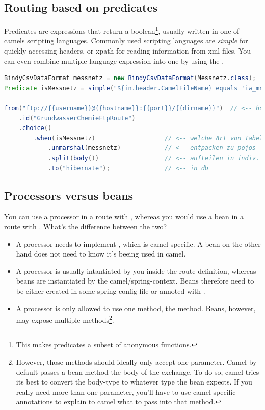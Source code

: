 \subsection{Routing based on predicates}
Predicates are expressions that return a boolean\footnote{This makes predicates a subset of anonymous functions.}, usually written in one of camels scripting languages. 
Commonly used scripting languages are \emph{simple} for quickly accessing headers, or xpath for reading information from xml-files. You can even combine multiple language-expression into one by using the .

\begin{lstlisting}[language=java]
BindyCsvDataFormat messnetz = new BindyCsvDataFormat(Messnetz.class);
Predicate isMessnetz = simple("${in.header.CamelFileName} equals 'iw_mn.txt'");

from("ftp://{{username}}@{{hostname}}:{{port}}/{{dirname}}")  // <-- hole von ftp
	.id("GrundwasserChemieFtpRoute")
	.choice()
		.when(isMessnetz)					// <-- welche Art von Tabelle?
			.unmarshal(messnetz)            // <-- entpacken zu pojos
			.split(body())                  // <-- aufteilen in indiv. reihen
			.to("hibernate");               // <-- in db
\end{lstlisting}




\subsection{Processors versus beans}
You can use a processor in a route with , whereas you would use a bean in a route with . What's the difference between the two?
\begin{itemize}
    \item A processor  needs to implement , which is camel-specific. A bean on the other hand does not need to know it's beeing used in camel. 
    \item A processor is usually intantiated by you inside the route-definition, whereas beans are instantiated by the camel/spring-context. Beans therefore need to be either created in some spring-config-file or annoted with .
    \item A processor is only allowed to use one method, the  method. Beans, however, may expose multiple methods\footnote{However, those methods should ideally only accept one parameter. Camel by default passes a bean-method the body of the exchange. To do so, camel tries its best to convert the body-type to whatever type the bean expects. If you really need more than one parameter, you'll have to use camel-specific annotations to explain to camel what to pass into that method.}. 
\end{itemize}


